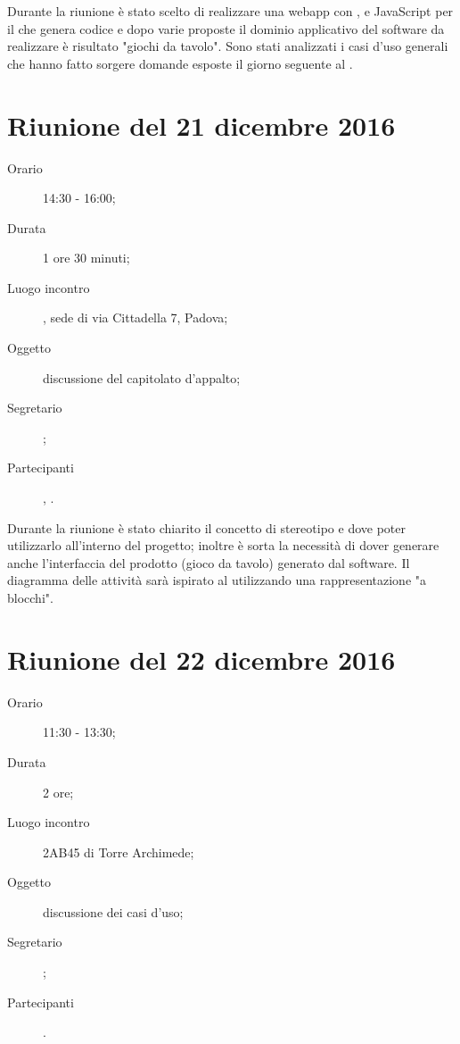 Durante la riunione è stato scelto di realizzare una webapp con , e JavaScript per il  che genera codice  e dopo varie proposte il dominio applicativo del software da realizzare è risultato "giochi da tavolo". 
Sono stati analizzati i casi d'uso generali che hanno fatto sorgere domande esposte il giorno seguente al \GP.



\section{Riunione del 21 dicembre 2016}

\begin{description}
	\item[Orario] 14:30 - 16:00;
	\item[Durata] 1 ore 30 minuti;
	\item[Luogo incontro] \ZU, sede di via Cittadella 7, Padova; 
	\item[Oggetto] discussione del capitolato d'appalto;
	\item[Segretario] \AZ; 
	\item[Partecipanti] \GP, \ALL.
\end{description}

Durante la riunione è stato chiarito il concetto di stereotipo e dove poter utilizzarlo all'interno del progetto; inoltre è sorta la necessità di dover generare anche l'interfaccia del prodotto (gioco da tavolo) generato dal software. Il diagramma delle attività sarà ispirato al  utilizzando una rappresentazione "a blocchi".



\section{Riunione del 22 dicembre 2016}

\begin{description}
	\item[Orario] 11:30 - 13:30;
	\item[Durata] 2 ore;
	\item[Luogo incontro] 2AB45 di Torre Archimede; 
	\item[Oggetto] discussione dei casi d'uso;
	\item[Segretario] \PB; 
	\item[Partecipanti] \ALL.
\end{description}

